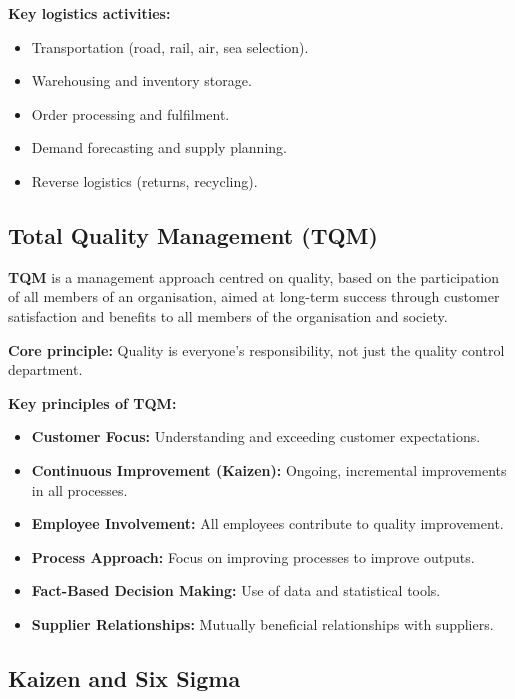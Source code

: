 \documentclass[12pt,a4paper]{article}
\begin{document}
\textbf{Key logistics activities:}
\begin{itemize}[leftmargin=*, itemsep=2pt]
  \item Transportation (road, rail, air, sea selection).
  \item Warehousing and inventory storage.
  \item Order processing and fulfilment.
  \item Demand forecasting and supply planning.
  \item Reverse logistics (returns, recycling).
\end{itemize}

\subsection{Total Quality Management (TQM)}

\begin{tcolorbox}[defbox, title={\textbf{Total Quality Management (TQM)}}]
\textbf{TQM} is a management approach centred on quality, based on the participation of all members of an organisation, aimed at long-term success through customer satisfaction and benefits to all members of the organisation and society.
\par\vspace{3pt}
\textbf{Core principle:} Quality is everyone's responsibility, not just the quality control department.
\end{tcolorbox}

\textbf{Key principles of TQM:}
\begin{itemize}[leftmargin=*, itemsep=2pt]
  \item \textbf{Customer Focus:} Understanding and exceeding customer expectations.
  \item \textbf{Continuous Improvement (Kaizen):} Ongoing, incremental improvements in all processes.
  \item \textbf{Employee Involvement:} All employees contribute to quality improvement.
  \item \textbf{Process Approach:} Focus on improving processes to improve outputs.
  \item \textbf{Fact-Based Decision Making:} Use of data and statistical tools.
  \item \textbf{Supplier Relationships:} Mutually beneficial relationships with suppliers.
\end{itemize}

\subsection{Kaizen and Six Sigma}
\end{document}
